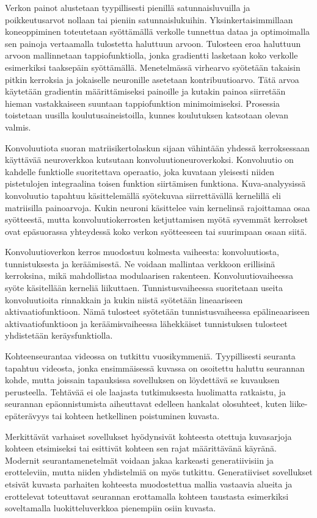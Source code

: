 Verkon painot alustetaan tyypillisesti pienillä satunnaisluvuilla ja poikkeutusarvot nollaan
tai pieniin satunnaislukuihin. Yksinkertaisimmillaan koneoppiminen toteutetaan syöttämällä
verkolle tunnettua dataa ja optimoimalla sen painoja vertaamalla tulostetta haluttuun arvoon.
Tulosteen eroa haluttuun arvoon mallinnetaan tappiofunktiolla, jonka gradientti lasketaan
koko verkolle esimerkiksi taaksepäin syöttämällä. Menetelmässä virhearvo syötetään takaisin
pitkin kerroksia ja jokaiselle neuronille asetetaan kontribuutioarvo. Tätä arvoa käytetään
gradientin määrittämiseksi painoille ja kutakin painoa siirretään hieman vastakkaiseen suuntaan
tappiofunktion minimoimiseksi. Prosessia toistetaan uusilla koulutusaineistoilla, kunnes
koulutuksen katsotaan olevan valmis.

Konvoluutiota suoran matriisikertolaskun sijaan vähintään yhdessä kerroksessaan käyttävää
neuroverkkoa kutsutaan konvoluutioneuroverkoksi. Konvoluutio on kahdelle funktiolle suoritettava
operaatio, joka kuvataan yleisesti niiden pistetulojen integraalina toisen funktion
siirtämisen funktiona. Kuva-analyysissä konvoluutio tapahtuu käsittelemällä syötekuvaa
siirrettävällä kernelillä eli matriisilla painoarvoja. Kukin neuroni käsittelee vain
kernelinsä rajoittamaa osaa syötteestä, mutta konvoluutiokerrosten ketjuttamisen myötä
syvemmät kerrokset ovat epäsuorassa yhteydessä koko verkon syötteeseen tai suurimpaan
osaan siitä.

Konvoluutioverkon kerros muodostuu kolmesta vaiheesta: konvoluutiosta, tunnistuksesta ja
keräämisestä. Ne voidaan mallintaa verkkoon erillisinä kerroksina, mikä mahdollistaa
modulaarisen rakenteen. Konvoluutiovaiheessa syöte käsitellään kerneliä liikuttaen.
Tunnistusvaiheessa suoritetaan useita konvoluutioita rinnakkain ja kukin niistä syötetään
lineaariseen aktivaatiofunktioon. Nämä tulosteet syötetään tunnistusvaiheessa epälineaariseen
aktivaatiofunktioon ja keräämisvaiheessa lähekkäiset tunnistuksen tulosteet yhdistetään
keräysfunktiolla.

Kohteenseurantaa videossa on tutkittu vuosikymmeniä. Tyypillisesti seuranta tapahtuu videosta,
jonka ensimmäisessä kuvassa on osoitettu haluttu seurannan kohde, mutta joissain tapauksissa
sovelluksen on löydettävä se kuvauksen perusteella. Tehtävää ei ole laajasta tutkimuksesta
huolimatta ratkaistu, ja seurannan epäonnistumista aiheuttavat edelleen hankalat olosuhteet,
kuten liike-epäterävyys tai kohteen hetkellinen poistuminen kuvasta.

Merkittävät varhaiset sovellukset hyödynsivät kohteesta otettuja kuvasarjoja kohteen etsimiseksi
tai esittivät kohteen sen rajat määrittävänä käyränä. Modernit seurantamenetelmät voidaan jakaa
karkeasti generatiivisiin ja erotteleviin, mutta niiden yhdistelmiä on myös tutkittu. Generatiiviset
sovellukset etsivät kuvasta parhaiten kohteesta muodostettua mallia vastaavia alueita ja erottelevat
toteuttavat seurannan erottamalla kohteen taustasta esimerkiksi soveltamalla luokitteluverkkoa
pienempiin osiin kuvasta.

